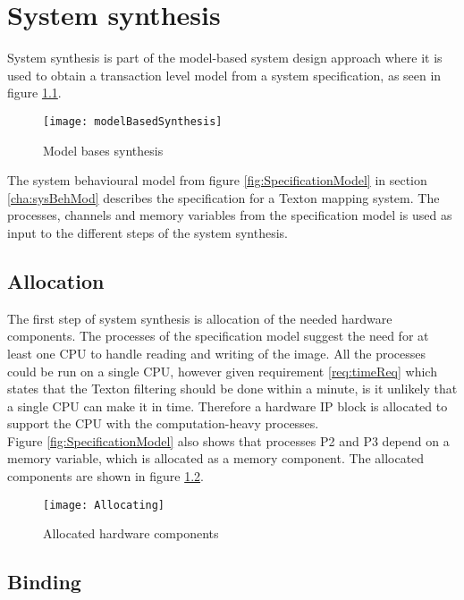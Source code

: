 \chapter{System synthesis}
System synthesis is part of the model-based system design approach where it is used to obtain a transaction level model from a system specification, as seen in figure \ref{fig:modelBasedSyn}. 

\begin{figure}[H]
\centering
\texttt{[image: modelBasedSynthesis]}
\caption{Model bases synthesis}
\label{fig:modelBasedSyn}
\end{figure}

The system behavioural model from figure \ref{fig:SpecificationModel} in section \ref{cha:sysBehMod} describes the specification for a Texton mapping system. 
The processes, channels and memory variables from the specification model is used as input to the different steps of the system synthesis.  

\section{Allocation}
The first step of system synthesis is allocation of the needed hardware components. 
The processes of the specification model suggest the need for at least one CPU to handle reading and writing of the image. 
All the processes could be run on a single CPU, however given requirement \ref{req:timeReq} which states that the Texton filtering should be done within a minute, is it unlikely that a single CPU can make it in time. 
Therefore a hardware IP block is allocated to support the CPU with the computation-heavy processes.
\\Figure \ref{fig:SpecificationModel} also shows that processes P2 and P3 depend on a memory variable, which is allocated as a memory component. The allocated components are shown in figure \ref{fig:allocHardComps}.

\begin{figure}[H]
\centering
\texttt{[image: Allocating]}
\caption{Allocated hardware components}
\label{fig:allocHardComps}
\end{figure}




\section{Binding}

